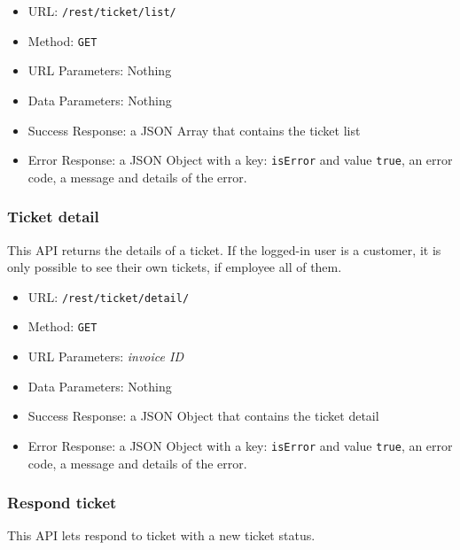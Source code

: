 \begin{itemize}
    \item URL: \texttt{/rest/ticket/list/}
    \item Method: \texttt{GET}
    \item URL Parameters: Nothing
    \item Data Parameters: Nothing
    \item Success Response:  a JSON Array that contains the ticket list
    \item Error Response: a JSON Object with a key: \texttt{isError}  and value \texttt{true}, an error code, a message and details of the error.
\end{itemize}

\subsubsection*{Ticket detail}

This API returns the details of a ticket.
If the logged-in user is a customer, it is only possible to see their own tickets, if employee all of them.

\begin{itemize}
    \item URL: \texttt{/rest/ticket/detail/}
    \item Method: \texttt{GET}
    \item URL Parameters: \textit{invoice ID}
    \item Data Parameters: Nothing
    \item Success Response: a JSON Object that contains the ticket detail
    \item Error Response: a JSON Object with a key: \texttt{isError}  and value \texttt{true}, an error code, a message and details of the error.
\end{itemize}


\subsubsection*{Respond ticket}

This API lets respond to ticket with a new ticket status.

